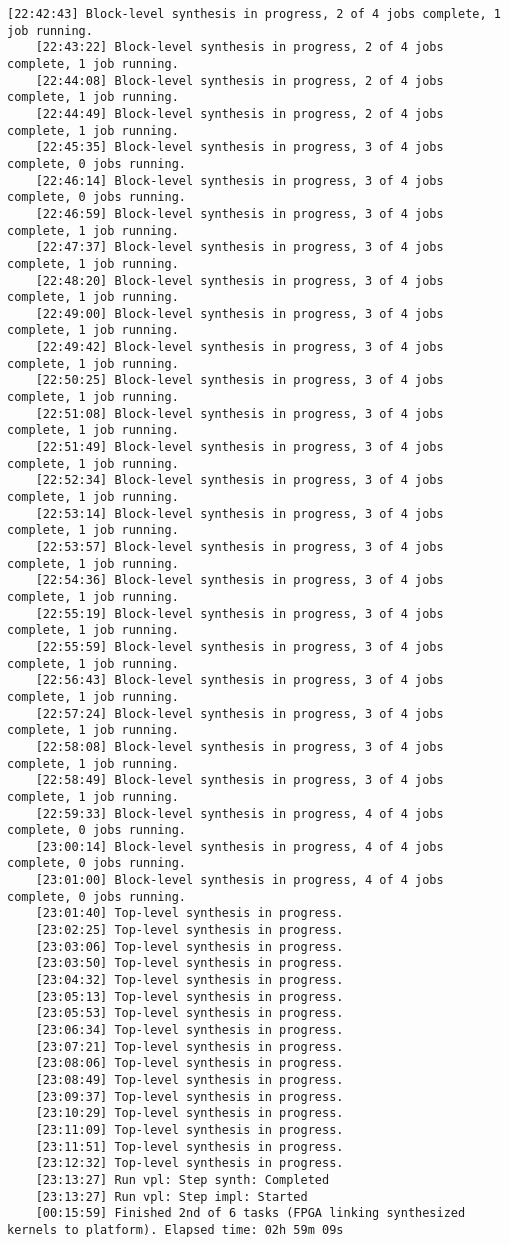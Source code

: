\begin{lstlisting}[caption=Содержимое файла v++\_vinc.log для измененного проекта, label={log2}]
	[22:42:43] Block-level synthesis in progress, 2 of 4 jobs complete, 1 job running.
	[22:43:22] Block-level synthesis in progress, 2 of 4 jobs complete, 1 job running.
	[22:44:08] Block-level synthesis in progress, 2 of 4 jobs complete, 1 job running.
	[22:44:49] Block-level synthesis in progress, 2 of 4 jobs complete, 1 job running.
	[22:45:35] Block-level synthesis in progress, 3 of 4 jobs complete, 0 jobs running.
	[22:46:14] Block-level synthesis in progress, 3 of 4 jobs complete, 0 jobs running.
	[22:46:59] Block-level synthesis in progress, 3 of 4 jobs complete, 1 job running.
	[22:47:37] Block-level synthesis in progress, 3 of 4 jobs complete, 1 job running.
	[22:48:20] Block-level synthesis in progress, 3 of 4 jobs complete, 1 job running.
	[22:49:00] Block-level synthesis in progress, 3 of 4 jobs complete, 1 job running.
	[22:49:42] Block-level synthesis in progress, 3 of 4 jobs complete, 1 job running.
	[22:50:25] Block-level synthesis in progress, 3 of 4 jobs complete, 1 job running.
	[22:51:08] Block-level synthesis in progress, 3 of 4 jobs complete, 1 job running.
	[22:51:49] Block-level synthesis in progress, 3 of 4 jobs complete, 1 job running.
	[22:52:34] Block-level synthesis in progress, 3 of 4 jobs complete, 1 job running.
	[22:53:14] Block-level synthesis in progress, 3 of 4 jobs complete, 1 job running.
	[22:53:57] Block-level synthesis in progress, 3 of 4 jobs complete, 1 job running.
	[22:54:36] Block-level synthesis in progress, 3 of 4 jobs complete, 1 job running.
	[22:55:19] Block-level synthesis in progress, 3 of 4 jobs complete, 1 job running.
	[22:55:59] Block-level synthesis in progress, 3 of 4 jobs complete, 1 job running.
	[22:56:43] Block-level synthesis in progress, 3 of 4 jobs complete, 1 job running.
	[22:57:24] Block-level synthesis in progress, 3 of 4 jobs complete, 1 job running.
	[22:58:08] Block-level synthesis in progress, 3 of 4 jobs complete, 1 job running.
	[22:58:49] Block-level synthesis in progress, 3 of 4 jobs complete, 1 job running.
	[22:59:33] Block-level synthesis in progress, 4 of 4 jobs complete, 0 jobs running.
	[23:00:14] Block-level synthesis in progress, 4 of 4 jobs complete, 0 jobs running.
	[23:01:00] Block-level synthesis in progress, 4 of 4 jobs complete, 0 jobs running.
	[23:01:40] Top-level synthesis in progress.
	[23:02:25] Top-level synthesis in progress.
	[23:03:06] Top-level synthesis in progress.
	[23:03:50] Top-level synthesis in progress.
	[23:04:32] Top-level synthesis in progress.
	[23:05:13] Top-level synthesis in progress.
	[23:05:53] Top-level synthesis in progress.
	[23:06:34] Top-level synthesis in progress.
	[23:07:21] Top-level synthesis in progress.
	[23:08:06] Top-level synthesis in progress.
	[23:08:49] Top-level synthesis in progress.
	[23:09:37] Top-level synthesis in progress.
	[23:10:29] Top-level synthesis in progress.
	[23:11:09] Top-level synthesis in progress.
	[23:11:51] Top-level synthesis in progress.
	[23:12:32] Top-level synthesis in progress.
	[23:13:27] Run vpl: Step synth: Completed
	[23:13:27] Run vpl: Step impl: Started
	[00:15:59] Finished 2nd of 6 tasks (FPGA linking synthesized kernels to platform). Elapsed time: 02h 59m 09s 
	

\end{lstlisting}
